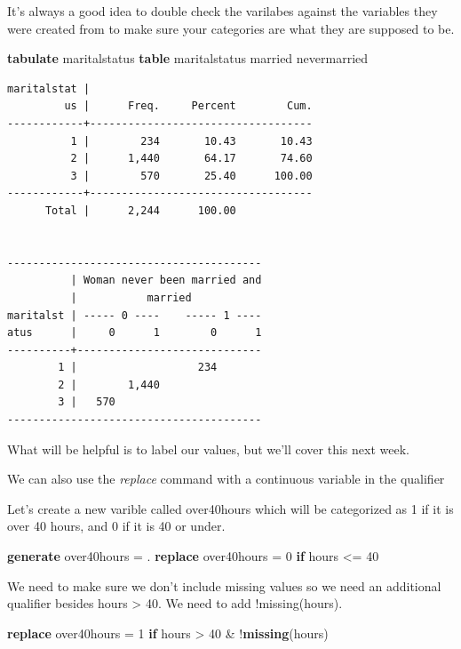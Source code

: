 \documentclass[
]{book}
\newenvironment{Shaded}{\begin{snugshade}}{\end{snugshade}}
\newcommand{\FunctionTok}[1]{\textcolor[rgb]{0.13,0.29,0.53}{\textbf{#1}}}
\newcommand{\KeywordTok}[1]{\textcolor[rgb]{0.13,0.29,0.53}{\textbf{#1}}}
\newcommand{\NormalTok}[1]{#1}
\begin{document}
It's always a good idea to double check the varilabes against the variables they were created from to make sure your categories are what they are supposed to be.

\begin{Shaded}
\begin{Highlighting}[]
\KeywordTok{tabulate}\NormalTok{ maritalstatus}
\KeywordTok{table}\NormalTok{ maritalstatus married nevermarried}
\end{Highlighting}
\end{Shaded}

\begin{verbatim}
maritalstat |
         us |      Freq.     Percent        Cum.
------------+-----------------------------------
          1 |        234       10.43       10.43
          2 |      1,440       64.17       74.60
          3 |        570       25.40      100.00
------------+-----------------------------------
      Total |      2,244      100.00


----------------------------------------
          | Woman never been married and
          |           married           
maritalst | ----- 0 ----    ----- 1 ----
atus      |     0      1        0      1
----------+-----------------------------
        1 |                   234       
        2 |        1,440                
        3 |   570                       
----------------------------------------
\end{verbatim}

What will be helpful is to label our values, but we'll cover this next week.

We can also use the \emph{replace} command with a continuous variable in the qualifier

Let's create a new varible called over40hours which will be categorized as 1 if it is over 40 hours, and 0 if it is 40 or under.

\begin{Shaded}
\begin{Highlighting}[]
\KeywordTok{generate}\NormalTok{ over40hours = .}
\KeywordTok{replace}\NormalTok{ over40hours = 0 }\KeywordTok{if}\NormalTok{ hours \textless{}= 40}
\end{Highlighting}
\end{Shaded}

We need to make sure we don't include missing values so we need an additional qualifier besides hours \textgreater{} 40. We need to add !missing(hours).

\begin{Shaded}
\begin{Highlighting}[]
\KeywordTok{replace}\NormalTok{ over40hours = 1 }\KeywordTok{if}\NormalTok{ hours \textgreater{} 40 \& !}\FunctionTok{missing}\NormalTok{(hours)}
\end{Highlighting}
\end{Shaded}
\end{document}
